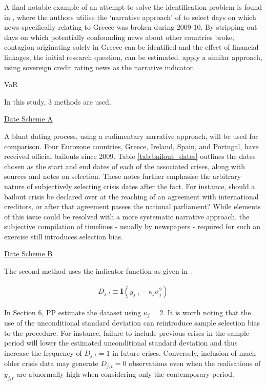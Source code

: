 \documentclass[../base.tex]{subfiles}
\begin{document}
A final notable example of an attempt to solve the identification problem is found in \cite{brutti2012transmission}, where the authors utilise the `narrative approach' of \cite{romer1989does} to select days on which news specifically relating to Greece was broken during 2009-10. By stripping out days on which potentially confounding news about other countries broke, contagion originating solely in Greece can be identified and the effect of financial linkages, the initial research question, can be estimated. \cite{arezki2011sovereign} apply a similar approach, using sovereign credit rating news as the narrative indicator. 




\cite{metiu2012sovereign} VaR

In this study, 3 methods are used. 

\underline{Date Scheme A}

A blunt dating process, using a rudimentary narrative approach, will be used for comparison. Four Eurozone countries, Greece, Ireland, Spain, and Portugal, have received official bailouts since 2009. Table \ref{tab:bailout_dates} outlines the dates chosen as the start and end dates of each of the associated crises, along with sources and notes on selection. These notes further emphasise the arbitrary nature of subjectively selecting crisis dates after the fact. For instance, should a bailout crisis be declared over at the reaching of an agreement with international creditors, or after that agreement passes the national parliament? While elements of this issue could be resolved with a more systematic narrative approach, the subjective compilation of timelines - usually by newspapers - required for such an exercise still introduces selection bias. 

\underline{Date Scheme B}

The second method uses the indicator function as given in \cite{pesaran2007econometric}.

\begin{align}
	D_{j, t} \equiv \mathbf{I}(y_{j,t} - \kappa_j \sigma^2_{j})
\end{align}

In Section 6, PP estimate the \cite{eichengreen1996contagious} dataset using $\kappa_j = 2$. It is worth noting that the use of the unconditional standard deviation can reintroduce sample selection bias to the procedure. For instance, failure to include previous crises in the sample period will lower the estimated unconditional standard deviation and thus increase the frequency of $D_{j,t} = 1$ in future crises. Conversely, inclusion of much older crisis data may generate $D_{j,t} = 0$ observations even when the realisations of $y_{j,t}$ are abnormally high when considering only the contemporary period. 
\end{document}
